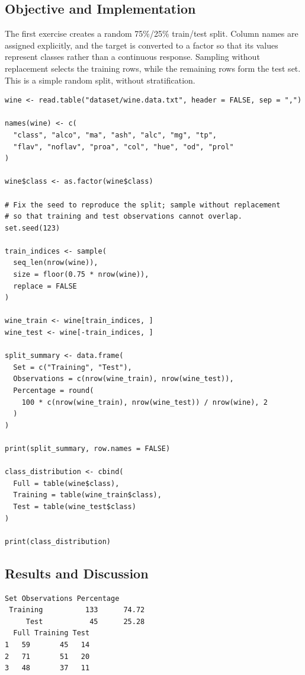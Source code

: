 \documentclass[11pt,a4paper]{article}
\begin{document}
\subsection{Objective and Implementation}
The first exercise creates a random 75\%/25\% train/test split. Column names are assigned explicitly, and the target is converted to a factor so that its values represent classes rather than a continuous response. Sampling without replacement selects the training rows, while the remaining rows form the test set. This is a simple random split, without stratification.
\begin{lstlisting}
wine <- read.table("dataset/wine.data.txt", header = FALSE, sep = ",")

names(wine) <- c(
  "class", "alco", "ma", "ash", "alc", "mg", "tp",
  "flav", "noflav", "proa", "col", "hue", "od", "prol"
)

wine$class <- as.factor(wine$class)

# Fix the seed to reproduce the split; sample without replacement
# so that training and test observations cannot overlap.
set.seed(123)

train_indices <- sample(
  seq_len(nrow(wine)),
  size = floor(0.75 * nrow(wine)),
  replace = FALSE
)

wine_train <- wine[train_indices, ]
wine_test <- wine[-train_indices, ]

split_summary <- data.frame(
  Set = c("Training", "Test"),
  Observations = c(nrow(wine_train), nrow(wine_test)),
  Percentage = round(
    100 * c(nrow(wine_train), nrow(wine_test)) / nrow(wine), 2
  )
)

print(split_summary, row.names = FALSE)

class_distribution <- cbind(
  Full = table(wine$class),
  Training = table(wine_train$class),
  Test = table(wine_test$class)
)

print(class_distribution)
\end{lstlisting}

\subsection{Results and Discussion}
\par\noindent\begin{minipage}{\linewidth}
  \begin{lstlisting}[style=console]
Set Observations Percentage
 Training          133      74.72
     Test           45      25.28
  Full Training Test
1   59       45   14
2   71       51   20
3   48       37   11
\end{lstlisting}
\end{minipage}\par
\end{document}
